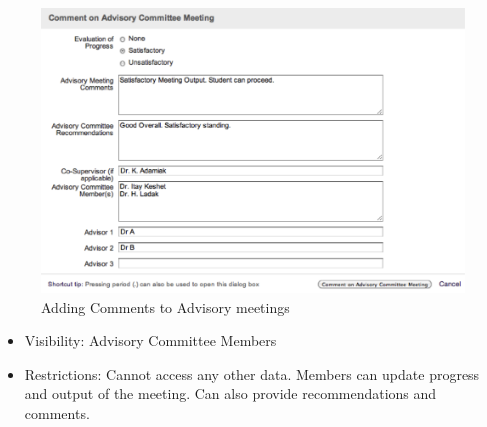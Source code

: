 \documentclass[11pt,a4paper]{report}
\begin{document}
\begin{itemize}
\begin{figure}[htp]
\centering
\includegraphics[scale=1]{diagrams/HTMLTemplating/CommentAdvisory.png}
\caption{Adding Comments to Advisory meetings}
\label{fig:UpdateCAM}
\end{figure}

\begin{itemize}
\item Visibility: Advisory Committee Members
\item Restrictions: Cannot access any other data. Members can update progress and output of the meeting. Can also provide recommendations and comments.
\end{itemize}
\end{itemize}
\end{document}
